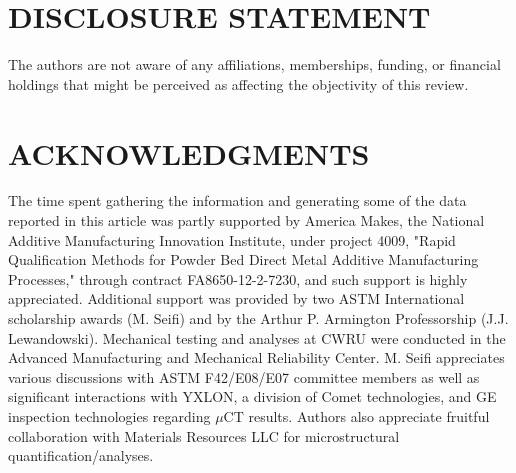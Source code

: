 \documentclass[10pt]{article}
\begin{document}
\section*{DISCLOSURE STATEMENT}
The authors are not aware of any affiliations, memberships, funding, or financial holdings that might be perceived as affecting the objectivity of this review.

\section*{ACKNOWLEDGMENTS}
The time spent gathering the information and generating some of the data reported in this article was partly supported by America Makes, the National Additive Manufacturing Innovation Institute, under project 4009, "Rapid Qualification Methods for Powder Bed Direct Metal Additive Manufacturing Processes," through contract FA8650-12-2-7230, and such support is highly appreciated. Additional support was provided by two ASTM International scholarship awards (M. Seifi) and by the Arthur P. Armington Professorship (J.J. Lewandowski). Mechanical testing and analyses at CWRU were conducted in the Advanced Manufacturing and Mechanical Reliability Center. M. Seifi appreciates various discussions with ASTM F42/E08/E07 committee members as well as significant interactions with YXLON, a division of Comet technologies, and GE inspection technologies regarding $\mu \mathrm{CT}$ results. Authors also appreciate fruitful collaboration with Materials Resources LLC for microstructural quantification/analyses.
\end{document}
